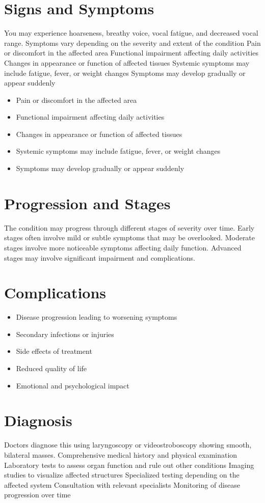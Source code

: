 \section{Signs and Symptoms}
You may experience hoarseness, breathy voice, vocal fatigue, and decreased vocal range. Symptoms vary depending on the severity and extent of the condition Pain or discomfort in the affected area Functional impairment affecting daily activities Changes in appearance or function of affected tissues Systemic symptoms may include fatigue, fever, or weight changes Symptoms may develop gradually or appear suddenly

\begin{itemize}[noitemsep]
  \item Pain or discomfort in the affected area
  \item Functional impairment affecting daily activities
  \item Changes in appearance or function of affected tissues
  \item Systemic symptoms may include fatigue, fever, or weight changes
  \item Symptoms may develop gradually or appear suddenly
\end{itemize}
\section{Progression and Stages}
The condition may progress through different stages of severity over time. Early stages often involve mild or subtle symptoms that may be overlooked. Moderate stages involve more noticeable symptoms affecting daily function. Advanced stages may involve significant impairment and complications.
\section{Complications}
\begin{itemize}[noitemsep]
  \item Disease progression leading to worsening symptoms
  \item Secondary infections or injuries
  \item Side effects of treatment
  \item Reduced quality of life
  \item Emotional and psychological impact
\end{itemize}
\section{Diagnosis}
Doctors diagnose this using laryngoscopy or videostroboscopy showing smooth, bilateral masses. Comprehensive medical history and physical examination Laboratory tests to assess organ function and rule out other conditions Imaging studies to visualize affected structures Specialized testing depending on the affected system Consultation with relevant specialists Monitoring of disease progression over time

